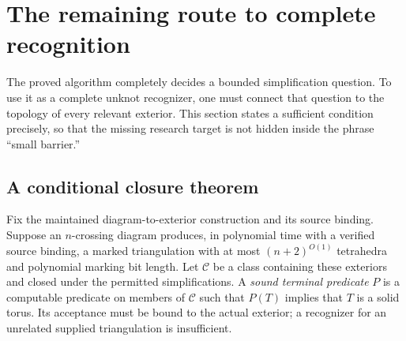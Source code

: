 \section{The remaining route to complete recognition}\label{sec:recognition}

The proved algorithm completely decides a bounded simplification question.
To use it as a complete unknot recognizer, one must connect that question
to the topology of every relevant exterior. This section states a sufficient
condition precisely, so that the missing research target is not hidden
inside the phrase ``small barrier.''

\subsection{A conditional closure theorem}

Fix the maintained diagram-to-exterior construction and its source binding.
Suppose an $n$-crossing diagram produces, in polynomial time with a verified
source binding, a marked triangulation with at most $(n+2)^{O(1)}$
tetrahedra and polynomial marking bit length. Let $\mathcal C$
be a class containing these exteriors and closed under the permitted
simplifications. A \emph{sound terminal predicate} $P$ is a computable
predicate on members of $\mathcal C$ such that $P(T)$ implies that $T$ is a
solid torus. Its acceptance must be bound to the actual exterior; a
recognizer for an unrelated supplied triangulation is insufficient.

